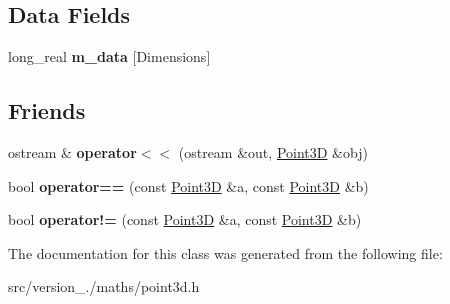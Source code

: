 \subsection*{Data Fields}
\begin{DoxyCompactItemize}
\item 
\mbox{\label{classez_1_1maths_1_1Point3D_a7317775480b085e9b358ec2413c152f1}} 
long\+\_\+real {\bfseries m\+\_\+data} \mbox{[}Dimensions\mbox{]}
\end{DoxyCompactItemize}
\subsection*{Friends}
\begin{DoxyCompactItemize}
\item 
\mbox{\label{classez_1_1maths_1_1Point3D_a7527ca5b54a5f63738146f81fb51bd5d}} 
ostream \& {\bfseries operator$<$$<$} (ostream \&out, \hyperlink{classez_1_1maths_1_1Point3D}{Point3D} \&obj)
\item 
\mbox{\label{classez_1_1maths_1_1Point3D_ad59e9f9fa003e8c8d63f2900c58290ad}} 
bool {\bfseries operator==} (const \hyperlink{classez_1_1maths_1_1Point3D}{Point3D} \&a, const \hyperlink{classez_1_1maths_1_1Point3D}{Point3D} \&b)
\item 
\mbox{\label{classez_1_1maths_1_1Point3D_a086f48e6230dca690774b4f2081d7710}} 
bool {\bfseries operator!=} (const \hyperlink{classez_1_1maths_1_1Point3D}{Point3D} \&a, const \hyperlink{classez_1_1maths_1_1Point3D}{Point3D} \&b)
\end{DoxyCompactItemize}


The documentation for this class was generated from the following file\+:\begin{DoxyCompactItemize}
\item 
src/version\+\_./maths/point3d.\+h\end{DoxyCompactItemize}
